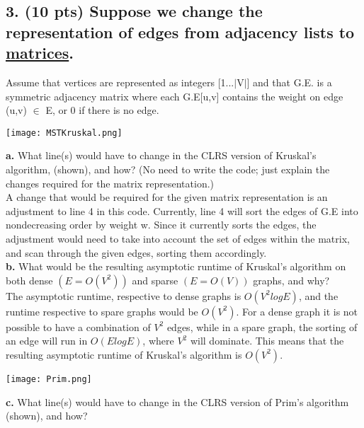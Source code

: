 \documentclass[12pt]{article}
\begin{document}
\subsection*{3. (10 pts) Suppose we change the representation of edges from adjacency lists to \underline{matrices}.}
Assume that vertices are represented as integers [1...$\lvert$V$\rvert$] and that G.E. is a symmetric adjacency matrix where each G.E[u,v] contains the weight on edge (u,v) $\in$ E, or 0 if there is no edge. \\
\linebreak
\begin{center}
\texttt{[image: MSTKruskal.png]} \\
\end{center}
\textbf{a.} What line(s) would have to change in the CLRS version of Kruskal's algorithm, (shown), and how? (No need to write the code; just explain the changes required for the matrix representation.) \\
\linebreak
A change that would be required for the given matrix representation is an adjustment to line 4 in this code. Currently, line 4 will sort the edges of G.E into nondecreasing order by weight w.  Since it currently sorts the edges, the adjustment would need to take into account the set of edges within the matrix, and scan through the given edges, sorting them accordingly. \\
\linebreak
\textbf{b.} What would be the resulting asymptotic runtime of Kruskal's algorithm on both dense $(E=O(V^2))$ and sparse $(E=O(V))$ graphs, and why? \\
The asymptotic runtime, respective to dense graphs is $O(V^2logE)$, and the runtime respective to spare graphs would be $O(V^2)$. For a dense graph it is not possible to have a combination of $V^2$ edges, while in a spare graph,  the sorting of an edge will run in $O(E log E)$, where $V^2$ will dominate.  This means that the resulting asymptotic runtime of Kruskal's algorithm is $O(V^2)$. \\
\linebreak
\begin{center}
\texttt{[image: Prim.png]}\\
\end{center}
\textbf{c.} What line(s) would have to change in the CLRS version of Prim's algorithm (shown), and how? \\
\linebreak
\end{document}
